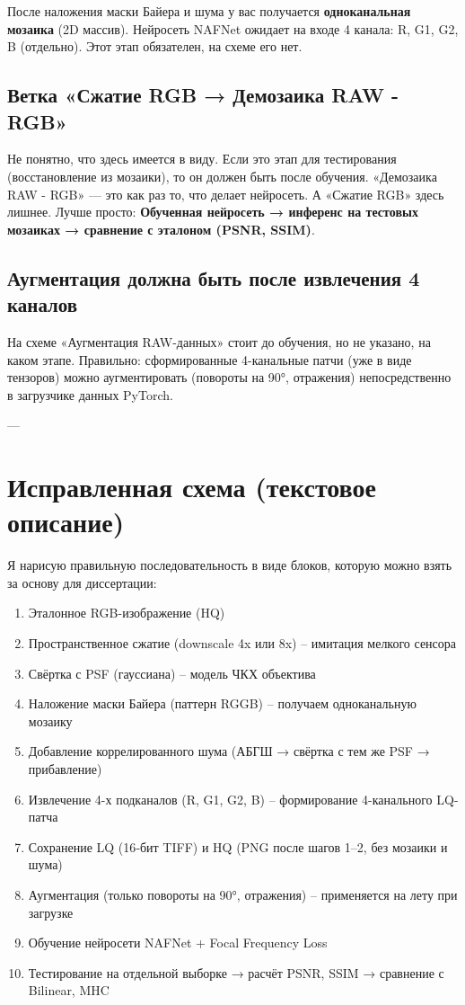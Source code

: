 \documentclass[12pt,a4paper]{article}
\begin{document}
После наложения маски Байера и шума у вас получается \textbf{одноканальная мозаика} (2D массив). Нейросеть NAFNet ожидает на входе 4 канала: R, G1, G2, B (отдельно). Этот этап обязателен, на схеме его нет.

\subsection{Ветка «Сжатие RGB → Демозаика RAW - RGB»}

Не понятно, что здесь имеется в виду. Если это этап для тестирования (восстановление из мозаики), то он должен быть после обучения. «Демозаика RAW - RGB» — это как раз то, что делает нейросеть. А «Сжатие RGB» здесь лишнее. Лучше просто: \textbf{Обученная нейросеть → инференс на тестовых мозаиках → сравнение с эталоном (PSNR, SSIM)}.

\subsection{Аугментация должна быть \textbf{после} извлечения 4 каналов}

На схеме «Аугментация RAW-данных» стоит до обучения, но не указано, на каком этапе. Правильно: сформированные 4-канальные патчи (уже в виде тензоров) можно аугментировать (повороты на 90°, отражения) непосредственно в загрузчике данных PyTorch.

---

\section{Исправленная схема (текстовое описание)}

Я нарисую правильную последовательность в виде блоков, которую можно взять за основу для диссертации:

\begin{enumerate}
    \item Эталонное RGB-изображение (HQ)
    \item Пространственное сжатие (downscale 4x или 8x) – имитация мелкого сенсора
    \item Свёртка с PSF (гауссиана) – модель ЧКХ объектива
    \item Наложение маски Байера (паттерн RGGB) – получаем одноканальную мозаику
    \item Добавление коррелированного шума (АБГШ → свёртка с тем же PSF → прибавление)
    \item Извлечение 4-х подканалов (R, G1, G2, B) – формирование 4-канального LQ-патча
    \item Сохранение LQ (16‑бит TIFF) и HQ (PNG после шагов 1–2, без мозаики и шума)
    \item Аугментация (только повороты на 90°, отражения) – применяется на лету при загрузке
    \item Обучение нейросети NAFNet + Focal Frequency Loss
    \item Тестирование на отдельной выборке → расчёт PSNR, SSIM → сравнение с Bilinear, MHC
\end{enumerate}
\end{document}
